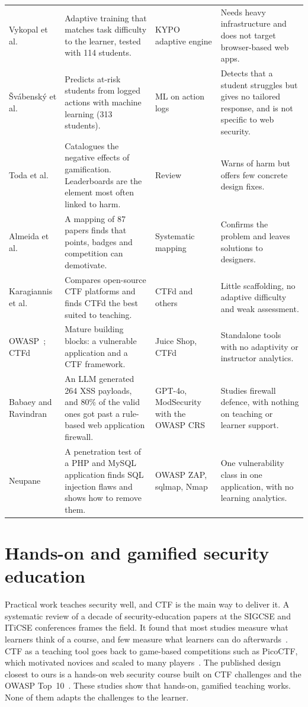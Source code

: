 \begin{longtable}{@{}P{2.6cm} P{4.8cm} P{2.6cm} P{4.6cm}@{}}
Vykopal et al.~\cite{Vykopal2023smart} & Adaptive training that matches task difficulty to the learner, tested with 114 students. & KYPO adaptive engine & Needs heavy infrastructure and does not target browser-based web apps. \\
Švábenský et al.~\cite{Svabensky2024detecting} & Predicts at-risk students from logged actions with machine learning (313 students). & ML on action logs & Detects that a student struggles but gives no tailored response, and is not specific to web security. \\
Toda et al.~\cite{Toda2018dark} & Catalogues the negative effects of gamification. Leaderboards are the element most often linked to harm. & Review & Warns of harm but offers few concrete design fixes. \\
Almeida et al.~\cite{Almeida2023negative} & A mapping of 87 papers finds that points, badges and competition can demotivate. & Systematic mapping & Confirms the problem and leaves solutions to designers. \\
Karagiannis et al.~\cite{Karagiannis2020analysis} & Compares open-source CTF platforms and finds CTFd the best suited to teaching. & CTFd and others & Little scaffolding, no adaptive difficulty and weak assessment. \\
OWASP~\cite{OwaspJuiceShop}; CTFd~\cite{CtfdDocs} & Mature building blocks: a vulnerable application and a CTF framework. & Juice Shop, CTFd & Standalone tools with no adaptivity or instructor analytics. \\
Babaey and Ravindran~\cite{Babaey2025genxss} & An LLM generated 264 XSS payloads, and 80\% of the valid ones got past a rule-based web application firewall. & GPT-4o, ModSecurity with the OWASP CRS & Studies firewall defence, with nothing on teaching or learner support. \\
Neupane~\cite{Neupane2025sqli} & A penetration test of a PHP and MySQL application finds SQL injection flaws and shows how to remove them. & OWASP ZAP, sqlmap, Nmap & One vulnerability class in one application, with no learning analytics. \\
\end{longtable}
\endgroup

\section{Hands-on and gamified security education}

Practical work teaches security well, and CTF is the main way to deliver it. A systematic review of a decade of security-education papers at the SIGCSE and ITiCSE conferences frames the field. It found that most studies measure what learners think of a course, and few measure what learners can do afterwards~\cite{Svabensky2020what}. CTF as a teaching tool goes back to game-based competitions such as PicoCTF, which motivated novices and scaled to many players~\cite{Chapman2014picoctf}. The published design closest to ours is a hands-on web security course built on CTF challenges and the OWASP Top~10~\cite{Ksiezopolski2022teaching}. These studies show that hands-on, gamified teaching works. None of them adapts the challenges to the learner.

